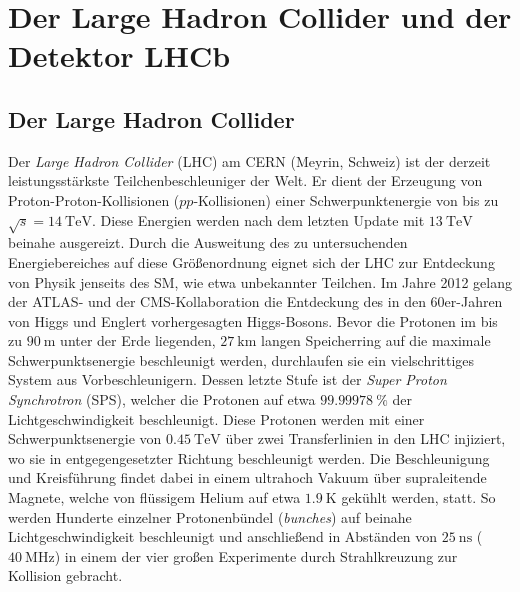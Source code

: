 \chapter{Der Large Hadron Collider und der Detektor LHCb}
\label{chap:3}
%
\section{Der Large Hadron Collider}
%
Der \textit{Large Hadron Collider} (LHC) am CERN (Meyrin, Schweiz) ist der derzeit leistungsstärkste Teilchenbeschleuniger der Welt. Er dient der Erzeugung von Proton-Proton-Kollisionen ($pp$-Kollisionen) einer Schwerpunktenergie von bis zu $\sqrt{s}=\SI{14}{\tera\electronvolt}$\cite{lhc}. Diese Energien werden nach dem letzten Update mit $\SI{13}{\tera\electronvolt}$ beinahe ausgereizt\cite{lhc}. Durch die Ausweitung des zu untersuchenden Energiebereiches auf diese Größenordnung eignet sich der LHC zur Entdeckung von Physik jenseits des SM, wie etwa unbekannter Teilchen. Im Jahre 2012 gelang der ATLAS- und der CMS-Kollaboration die Entdeckung des in den 60er-Jahren von Higgs und Englert vorhergesagten Higgs-Bosons\cite{higgs}.
Bevor die Protonen im bis zu $\SI{90}{\meter}$ unter der Erde liegenden, $\SI{27}{\kilo\meter}$ langen Speicherring auf die maximale Schwerpunktsenergie beschleunigt werden, durchlaufen sie ein vielschrittiges System aus Vorbeschleunigern. Dessen letzte Stufe ist der \textit{Super Proton Synchrotron} (SPS), welcher die Protonen auf etwa $\SI{99,99978}{\percent}$ der Lichtgeschwindigkeit beschleunigt\cite{lhc}. Diese Protonen werden mit einer Schwerpunktsenergie von $\SI{0,45}{\tera\electronvolt}$ über zwei Transferlinien in den LHC injiziert, wo sie in entgegengesetzter Richtung beschleunigt werden. Die Beschleunigung und Kreisführung findet dabei in einem ultrahoch Vakuum über supraleitende Magnete, welche von flüssigem Helium auf etwa $\SI{1,9}{\kelvin}$ gekühlt werden, statt. So werden Hunderte einzelner Protonenbündel (\textit{bunches}) auf beinahe Lichtgeschwindigkeit beschleunigt und anschließend in Abständen von $\SI{25}{\nano\second}$
($\SI{40}{\mega\hertz}$) in einem der vier großen Experimente durch Strahlkreuzung zur Kollision gebracht.
%
